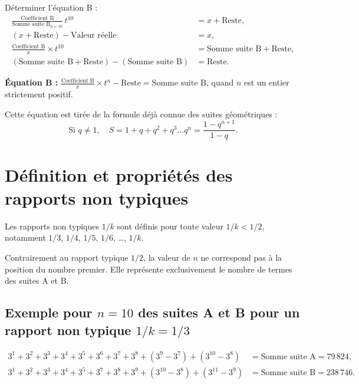 \documentclass[11pt,a4paper]{article}
\begin{document}
\begin{boitenote}
Déterminer l'équation B :
\begin{align*}
\frac{\text{Coefficient B}}{\text{Somme suite B}_{n=10}}\,t^{10}
&=x+\text{Reste},\\
(x+\text{Reste})-\text{Valeur réelle}&=x,\\
\frac{\text{Coefficient B}}{x}\times t^{10}
&=\text{Somme suite B}+\text{Reste},\\
(\text{Somme suite B}+\text{Reste})-(\text{Somme suite B})
&=\text{Reste}.
\end{align*}

\textbf{Équation B :} $\displaystyle \frac{\text{Coefficient B}}{x} \times t^{n} - \text{Reste} = \text{Somme suite B}$,
quand $n$ est un entier strictement positif.

\vspace{0.3cm}
\begin{boitenote}[Inspiration]
Cette équation est tirée de la formule déjà connue des suites géométriques :
\[
\text{Si } q \neq 1,\quad S = 1 + q + q^{2} + q^{3} \dots q^{n} = \frac{1 - q^{n+1}}{1 - q}.
\]


\section{Définition et propriétés des rapports non typiques}

Les rapports non typiques $1/k$ sont définis pour toute valeur $1/k < 1/2$,
notamment $1/3$, $1/4$, $1/5$, $1/6$, \dots, $1/k$.

Contrairement au rapport typique $1/2$, la valeur de $n$ ne correspond pas à la
position du nombre premier. Elle représente exclusivement le nombre de termes
des suites A et B.

\subsection{Exemple pour $n=10$ des suites A et B pour un rapport non typique $1/k = 1/3$}

\vspace{0.3cm}
\begin{boiteformule}[Sommes des suites A et B --- rapport $1/3$, $n = 10$]
\begin{align*}
3^{1}+3^{2}+3^{3}+3^{4}+3^{5}+3^{6}+3^{7}+3^{8}+(3^{9}-3^{7})+(3^{10}-3^{8})
  &= \text{Somme suite A} = 79\,824,\\
3^{1}+3^{2}+3^{3}+3^{4}+3^{5}+3^{7}+3^{8}+3^{9}+(3^{10}-3^{8})+(3^{11}-3^{9})
  &= \text{Somme suite B} = 238\,746.
\end{align*}
\end{boiteformule}


\end{boitenote}
\end{boitenote}
\end{document}
